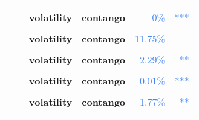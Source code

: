 \documentclass[
  authoryear,
  preprint,
  3p]{elsarticle}
\begin{document}
\begin{longtable}[t]{>{}l>{}l>{}l>{}l>{}r>{}r}
\addlinespace
\textbf{\cellcolor{gray!10}{}} & \textbf{\cellcolor{gray!10}{post-crisis}} & \textbf{\cellcolor{gray!10}{mean}} & \textbf{\cellcolor{gray!10}{backwardation}} & \textcolor[HTML]{4285f4}{\cellcolor{gray!10}{73.44\%}} & \textcolor[HTML]{4285f4}{\cellcolor{gray!10}{}}\\
\textbf{} & \textbf{} & \textbf{volatility} & \textbf{contango} & \textcolor[HTML]{4285f4}{0\%} & \textcolor[HTML]{4285f4}{\vphantom{4} ***}\\
\textbf{\cellcolor{gray!10}{Zinc (XLME)}} & \textbf{\cellcolor{gray!10}{past}} & \textbf{\cellcolor{gray!10}{mean}} & \textbf{\cellcolor{gray!10}{contango}} & \textcolor[HTML]{4285f4}{\cellcolor{gray!10}{59.39\%}} & \textcolor[HTML]{4285f4}{\cellcolor{gray!10}{}}\\
\textbf{} & \textbf{} & \textbf{volatility} & \textbf{contango} & \textcolor[HTML]{4285f4}{11.75\%} & \textcolor[HTML]{4285f4}{}\\
\textbf{\cellcolor{gray!10}{}} & \textbf{\cellcolor{gray!10}{financialisation}} & \textbf{\cellcolor{gray!10}{mean}} & \textbf{\cellcolor{gray!10}{contango}} & \textcolor[HTML]{4285f4}{\cellcolor{gray!10}{37.67\%}} & \textcolor[HTML]{4285f4}{\cellcolor{gray!10}{}}\\
\addlinespace
\textbf{} & \textbf{} & \textbf{volatility} & \textbf{contango} & \textcolor[HTML]{4285f4}{2.29\%} & \textcolor[HTML]{4285f4}{**}\\
\textbf{\cellcolor{gray!10}{}} & \textbf{\cellcolor{gray!10}{crisis}} & \textbf{\cellcolor{gray!10}{mean}} & \textbf{\cellcolor{gray!10}{backwardation}} & \textcolor[HTML]{4285f4}{\cellcolor{gray!10}{91.89\%}} & \textcolor[HTML]{4285f4}{\cellcolor{gray!10}{}}\\
\textbf{} & \textbf{} & \textbf{volatility} & \textbf{contango} & \textcolor[HTML]{4285f4}{0.01\%} & \textcolor[HTML]{4285f4}{***}\\
\textbf{\cellcolor{gray!10}{}} & \textbf{\cellcolor{gray!10}{post-crisis}} & \textbf{\cellcolor{gray!10}{mean}} & \textbf{\cellcolor{gray!10}{backwardation}} & \textcolor[HTML]{4285f4}{\cellcolor{gray!10}{5.05\%}} & \textcolor[HTML]{4285f4}{\cellcolor{gray!10}{*}}\\
\textbf{} & \textbf{} & \textbf{volatility} & \textbf{contango} & \textcolor[HTML]{4285f4}{1.77\%} & \textcolor[HTML]{4285f4}{**}\\
\addlinespace
\textbf{\cellcolor{gray!10}{US commodities}} & \textbf{\cellcolor{gray!10}{past}} & \textbf{\cellcolor{gray!10}{mean}} & \textbf{\cellcolor{gray!10}{backwardation}} & \textcolor[HTML]{4285f4}{\cellcolor{gray!10}{3.63\%}} & \textcolor[HTML]{4285f4}{\cellcolor{gray!10}{**}}\\

\end{longtable}
\end{document}
